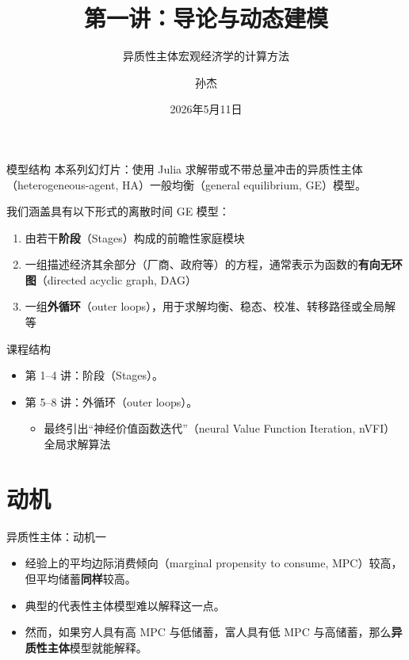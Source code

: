 \documentclass[10pt,aspectratio=169]{beamer}
\title{第一讲：导论与动态建模}
\subtitle{异质性主体宏观经济学的计算方法}
\author{孙杰}
\institute{多伦多大学}
\date{2026年5月11日}
\begin{document}
\maketitle

\begin{frame}{模型结构}
  本系列幻灯片：使用 Julia 求解带或不带总量冲击的异质性主体（heterogeneous-agent, HA）一般均衡（general equilibrium, GE）模型。

  我们涵盖具有以下形式的离散时间 GE 模型：
  \begin{enumerate}
    \item 由若干\textbf{阶段}（Stages）构成的前瞻性家庭模块
    \item 一组描述经济其余部分（厂商、政府等）的方程，通常表示为函数的\textbf{有向无环图}（directed acyclic graph, DAG）
    \item 一组\textbf{外循环}（outer loops），用于求解均衡、稳态、校准、转移路径或全局解等
  \end{enumerate}
\end{frame}

\begin{frame}{课程结构}
  \begin{itemize}
    \item 第 1--4 讲：阶段（Stages）。
    \item 第 5--8 讲：外循环（outer loops）。
    \begin{itemize}
      \item 最终引出``神经价值函数迭代''（neural Value Function Iteration, nVFI）全局求解算法
    \end{itemize}
  \end{itemize}
\end{frame}

\section{动机}

\begin{frame}{异质性主体：动机一}
  \begin{itemize}
    \item 经验上的平均边际消费倾向（marginal propensity to consume, MPC）较高，但平均储蓄\textbf{同样}较高。
    \item 典型的代表性主体模型难以解释这一点。
    \item 然而，如果穷人具有高 MPC 与低储蓄，富人具有低 MPC 与高储蓄，那么\textbf{异质性主体}模型就能解释。
  \end{itemize}
\end{frame}
\end{document}
